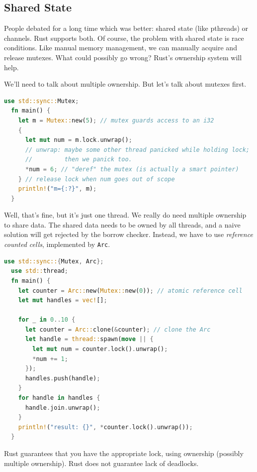 \documentclass[a4paper]{report}
\begin{document}
\subsection*{Shared State}
People debated for a long time which was better: shared state (like pthreads) or channels.
Rust supports both. Of course, the problem with shared state is race conditions.
Like manual memory management, we can manually acquire and release mutexes. What could
possibly go wrong? Rust's ownership system will help.

We'll need to talk about multiple ownership. But let's talk about mutexes first.
\begin{lstlisting}[language=Rust]
  use std::sync::Mutex;
  fn main() {
    let m = Mutex::new(5); // mutex guards access to an i32
    {
      let mut num = m.lock.unwrap();
      // unwrap: maybe some other thread panicked while holding lock;
      //         then we panick too.
      *num = 6; // "deref" the mutex (is actually a smart pointer)
    } // release lock when num goes out of scope
    println!("m={:?}", m);
  }
\end{lstlisting}
Well, that's fine, but it's just one thread. We really do need multiple ownership
to share data. The shared data needs to be owned by all threads, and a naive solution
will get rejected by the borrow checker. Instead, we have to use \emph{reference counted
  cells}, implemented by {\tt Arc}.
\begin{lstlisting}[language=Rust]
  use std::sync::{Mutex, Arc};
  use std::thread;
  fn main() {
    let counter = Arc::new(Mutex::new(0)); // atomic reference cell
    let mut handles = vec![];

    for _ in 0..10 {
      let counter = Arc::clone(&counter); // clone the Arc
      let handle = thread::spawn(move || {
        let mut num = counter.lock().unwrap();
        *num += 1;
      });
      handles.push(handle);
    }
    for handle in handles {
      handle.join.unwrap();
    }
    println!("result: {}", *counter.lock().unwrap());
  }
\end{lstlisting}
Rust guarantees that you have the appropriate lock, using ownership (possibly multiple ownership).
Rust does not guarantee lack of deadlocks.






\end{document}
